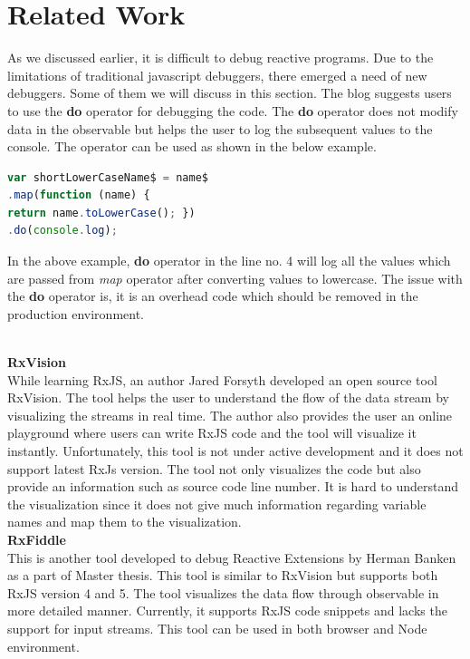 \section{Related Work}
As we discussed earlier, it is difficult to debug reactive programs. Due to the limitations of traditional javascript debuggers, there emerged a need of new debuggers. Some of them we will discuss in this section. The blog\cite{debugrxjsblog} suggests users to use the \textbf{do} operator for debugging the code. The \textbf{do} operator does not modify data in the observable but helps the user to log the subsequent values to the console. The operator can be used as shown in the below example.
\begin{lstlisting}[language=JavaScript, caption=Do operator usage, label={lst:do-operator-example}]
var shortLowerCaseName$ = name$
.map(function (name) {
return name.toLowerCase(); })
.do(console.log);
\end{lstlisting}

In the above example, \textbf{do} operator in the line no. 4 will log all the values which are passed from \textit{map} operator after converting values to lowercase. The issue with the \textbf{do} operator is, it is an overhead code which should be removed in the production environment. 

\leavevmode
\\
\textbf{RxVision}
\\
While learning RxJS, an author Jared Forsyth developed an open source tool RxVision\cite{rxvision}. The tool helps the user to understand the flow of the data stream by visualizing the streams in real time. The author also provides the user an online playground where users can write RxJS code and the tool will visualize it instantly\cite{rxvisionplayground}. Unfortunately, this tool is not under active development and it does not support latest RxJs version. The tool not only visualizes the code but also provide an information such as source code line number. It is hard to understand the visualization since it does not give much information regarding variable names and map them to the visualization. 
\leavevmode
\\
\textbf{RxFiddle}
\\
This is another tool developed to debug Reactive Extensions by Herman Banken as a part of Master thesis\cite{rxfiddle}.  
This tool is similar to RxVision but supports both RxJS version 4 and 5. The tool visualizes the data flow through observable in more detailed manner. 
Currently, it supports RxJS code snippets and lacks the support for input streams\cite{rxfiddle}. This tool can be used in both browser and Node environment.  


